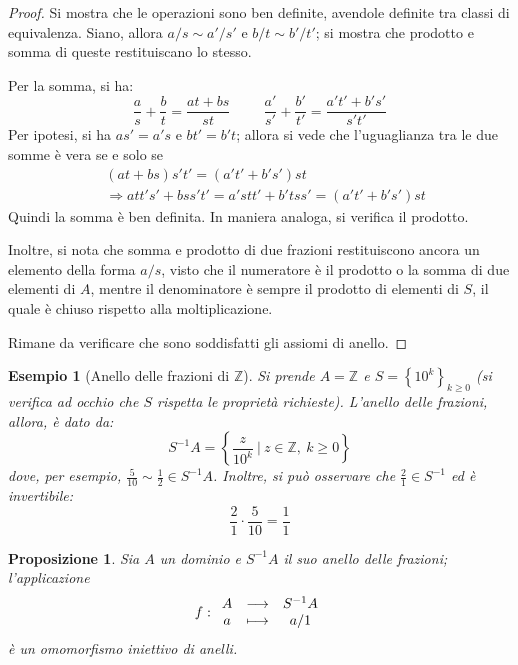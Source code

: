 \documentclass[12pt]{scrartcl}
\theoremstyle{style}
\newtheorem{esempio}{Esempio}[section]
\newtheorem{prop}{Proposizione}[section]
\numberwithin{equation}{subsection}
\begin{document}
	\begin{proof}
		Si mostra che le operazioni sono ben definite, avendole definite tra classi di equivalenza. 
		Siano, allora $a / s \sim a' / s' $ e $ b/t \sim b' / t'$; si mostra che prodotto e somma di queste restituiscano lo stesso.

		Per la somma, si ha:
		\[
		\frac{a}{s}+\frac{b}{t}=\frac{at + bs}{st}\hspace{1cm}\frac{a'}{s'}+\frac{b'}{t'}=\frac{a't' + b's'}{s't'}
		\] 
		Per ipotesi, si ha $as' = a' s $ e $bt' = b' t$; allora si vede che l'uguaglianza tra le due somme \`e vera se e solo se 
		\[
			\begin{split}
				&(at + bs ) s ' t' = (a't'+b's') st\\
				&\Rightarrow att's' + bs s't' = a'st t ' + b't s s' = (a't'+b's') st
			\end{split}
		\] 
		Quindi la somma \`e ben definita.
		In maniera analoga, si verifica il prodotto.

		Inoltre, si nota che somma e prodotto di due frazioni restituiscono ancora un elemento della forma $a / s$, visto che il numeratore \`e il prodotto o la somma di due elementi di $A$, mentre il denominatore \`e sempre il prodotto di elementi di $S$, il quale \`e chiuso rispetto alla moltiplicazione.
		
		Rimane da verificare che sono soddisfatti gli assiomi di anello.
	\end{proof}
\begin{esempio}
	[Anello delle frazioni di $\mathbb{Z}$]
	Si prende $A = \mathbb{Z}$ e $S = \left\{ 10^k \right\} _{k\ge 0} $ (si verifica ad occhio che $S$ rispetta le propriet\`a richieste).
	L'anello delle frazioni, allora, \`e dato da:
	\[
	S^{-1} A = \left\{ \frac{z}{10^k} \ \Big\lvert \ z \in \mathbb{Z}, \ k\ge 0 \right\} 
	\] 
	dove, per esempio, $\displaystyle \frac{5}{10}\sim \frac{1}{2} \in S^{-1}A$.
	Inoltre, si pu\`o osservare che $\displaystyle \frac{2}{1} \in S^{-1}$ ed \`e invertibile:
	\[
	\frac{2}{1}\cdot \frac{5}{10} = \frac{1}{1}
	\] 
\end{esempio}
\begin{prop}\label{aext}
	Sia $A$ un dominio e $S ^{-1}A$ il suo anello delle frazioni; l'applicazione
	\[
f : 
		\begin{array}
			{c c c}
			A &\longrightarrow& S^{-1}A\\
			a &\longmapsto & a / 1
		\end{array}
	\] 
	\`e un omomorfismo iniettivo di anelli.
\end{prop}
\end{document}
